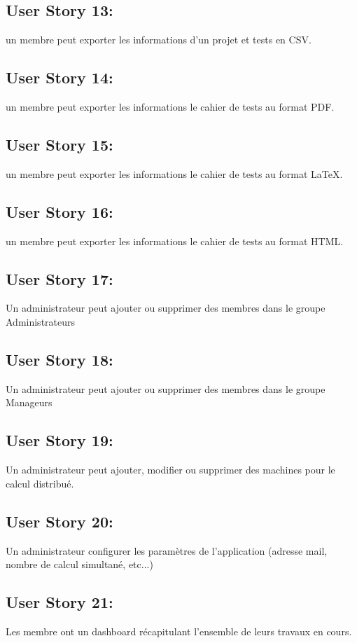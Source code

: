 	\subsection{User Story 13:}
	un membre peut exporter les informations d'un projet et tests en CSV.
	
	\subsection{User Story 14:}
	un membre peut exporter les informations le cahier de tests au format PDF.
		
	\subsection{User Story 15:}
	un membre peut exporter les informations le cahier de tests au format \LaTeX{}.
		
	\subsection{User Story 16:}
	un membre peut exporter les informations le cahier de tests au format HTML.
		
	\subsection{User Story 17:}
	Un administrateur peut ajouter ou supprimer des membres dans le groupe Administrateurs 
	
	\subsection{User Story 18:}
	Un administrateur peut ajouter ou supprimer des membres dans le groupe Manageurs
	
	\subsection{User Story 19:}
	Un administrateur peut ajouter, modifier ou supprimer des machines pour le calcul distribué.
		
	\subsection{User Story 20:}
	Un administrateur configurer les paramètres de l'application (adresse mail, nombre de calcul simultané, etc...)
		
	\subsection{User Story 21:}
	Les membre ont un dashboard récapitulant l'ensemble de leurs travaux en cours.
	
